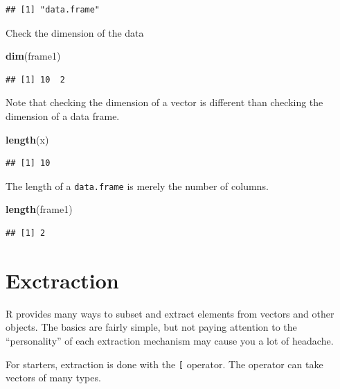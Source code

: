 \documentclass[]{book}
\newenvironment{Shaded}{\begin{snugshade}}{\end{snugshade}}
\newcommand{\KeywordTok}[1]{\textcolor[rgb]{0.13,0.29,0.53}{\textbf{#1}}}
\newcommand{\NormalTok}[1]{#1}
\theoremstyle{definition}
\theoremstyle{definition}
\theoremstyle{definition}
\theoremstyle{remark}
\begin{document}
\begin{verbatim}
## [1] "data.frame"
\end{verbatim}

Check the dimension of the data

\begin{Shaded}
\begin{Highlighting}[]
\KeywordTok{dim}\NormalTok{(frame1)                             }
\end{Highlighting}
\end{Shaded}

\begin{verbatim}
## [1] 10  2
\end{verbatim}

Note that checking the dimension of a vector is different than checking the dimension of a data frame.

\begin{Shaded}
\begin{Highlighting}[]
\KeywordTok{length}\NormalTok{(x)}
\end{Highlighting}
\end{Shaded}

\begin{verbatim}
## [1] 10
\end{verbatim}

The length of a \texttt{data.frame} is merely the number of columns.

\begin{Shaded}
\begin{Highlighting}[]
\KeywordTok{length}\NormalTok{(frame1) }
\end{Highlighting}
\end{Shaded}

\begin{verbatim}
## [1] 2
\end{verbatim}

\hypertarget{exctraction}{%
\section{Exctraction}\label{exctraction}}

R provides many ways to subset and extract elements from vectors and other objects.
The basics are fairly simple, but not paying attention to the ``personality'' of each extraction mechanism may cause you a lot of headache.

For starters, extraction is done with the \texttt{{[}} operator.
The operator can take vectors of many types.
\end{document}
